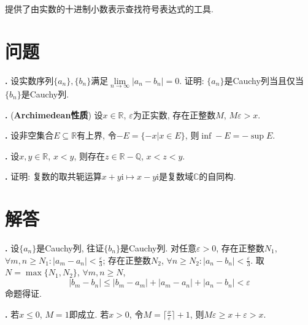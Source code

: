\par \cite{ISC}提供了由实数的十进制小数表示查找符号表达式的工具. 

\section*{问题}

\par \textbf{\theprobnum .} \cite{AnT1} 设实数序列$\{a_n\},\{b_n\}$满足$\lim\limits_{n\to \infty} |a_n-b_n|=0$. 证明: $\{a_n\}$是Cauchy列当且仅当$\{b_n\}$是Cauchy列. 

\par \textbf{\theprobnum .} (\textbf{Archimedean性质}) 设$x\in \mathbb{R}$, $\varepsilon$为正实数, 存在正整数$M$, $M\varepsilon>x$.

\par \textbf{\theprobnum .} \cite{AnT1} 设非空集合$E\subseteq \mathbb{R}$有上界, 令$-E=\{-x\vert x\in E\}$, 则$\inf -E=-\sup E$.

\par \textbf{\theprobnum .} \cite{AnT1} 设$x,y\in \mathbb{R}$, $x<y$, 则存在$z\in \mathbb{R}-\mathbb{Q}$, $x<z<y$. 

\par \textbf{\theprobnum .} 证明: 复数的取共轭运算$x+y\mathrm{i}\mapsto x-y\mathrm{i}$是复数域$\mathbb{C}$的自同构. 

\section*{解答}

\par \textbf{\thesolnum .} 设$\{a_n\}$是Cauchy列, 往证$\{b_n\}$是Cauchy列. 对任意$\varepsilon>0$, 存在正整数$N_1$, $\forall m, n\ge N_1: |a_m-a_n|<\frac{\varepsilon}{3}$; 存在正整数$N_2$, $\forall n\ge N_2: |a_n-b_n|<\frac{\varepsilon}{3}$. 取$N=\max\{N_1, N_2\}$, $\forall m,n \ge N$,
\begin{equation}
    |b_m-b_n| \le |b_m-a_m|+|a_m-a_n|+|a_n-b_n|<\varepsilon
\end{equation}
命题得证. 

\par \textbf{\thesolnum .} 若$x\le 0$, $M=1$即成立. 若$x>0$, 令$M=\lceil \frac{x}{\varepsilon} \rceil + 1$, 则$M\varepsilon \ge x + \varepsilon > x$.

